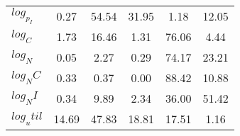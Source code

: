 \begin{center}
\begin{longtable}{lccccc}
$log_p_I   $	 & 	        0.27	 & 	       54.54	 & 	       31.95	 & 	        1.18	 & 	       12.05 \\ 
$log_C     $	 & 	        1.73	 & 	       16.46	 & 	        1.31	 & 	       76.06	 & 	        4.44 \\ 
$log_N     $	 & 	        0.05	 & 	        2.27	 & 	        0.29	 & 	       74.17	 & 	       23.21 \\ 
$log_NC    $	 & 	        0.33	 & 	        0.37	 & 	        0.00	 & 	       88.42	 & 	       10.88 \\ 
$log_NI    $	 & 	        0.34	 & 	        9.89	 & 	        2.34	 & 	       36.00	 & 	       51.42 \\ 
$log_util  $	 & 	       14.69	 & 	       47.83	 & 	       18.81	 & 	       17.51	 & 	        1.16 \\ 
\end{longtable}
 \end{center}
